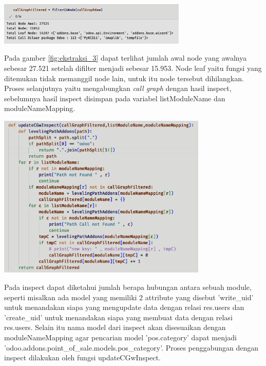 \begin{center}
	\includegraphics[width=9cm]{img/bab_4/ekstraksi_3.png}
	\label{fig:ekstraksi_3}
\end{center}

Pada gamber \ref{fig:ekstraksi_3} dapat terlihat jumlah awal node yang awalnya sebesar 27.521 setelah difilter menjadi sebesar 15.953. Node leaf yaitu fungsi yang ditemukan tidak memanggil node lain, untuk itu node tersebut dihilangkan. Proses selanjutnya yaitu mengabungkan \textit{call graph} dengan hasil inspect, sebelumnya hasil inspect disimpan pada variabel listModuleName dan moduleNameMapping. 

\begin{center}
	\includegraphics[width=10cm]{img/bab_4/ekstraksi_4.png}
	\label{fig:ekstraksi_4}
\end{center}

Pada inspect dapat diketahui jumlah berapa hubungan antara sebuah module, seperti misalkan ada model yang memiliki 2 attribute yang disebut 'write{\_}uid' untuk menandakan siapa  yang mengupdate data dengan relasi res.users dan 'create{\_}uid' untuk menandakan siapa  yang membuat data dengan relasi res.users. Selain itu nama model dari inspect akan disesuaikan dengan moduleNameMapping agar pencarian model 'pos.category' dapat menjadi 'odoo.addons.point{\_}of{\_}sale.models.pos{\_}category'. Proses penggabungan dengan inspect dilakukan oleh fungsi updateCGwInspect.


